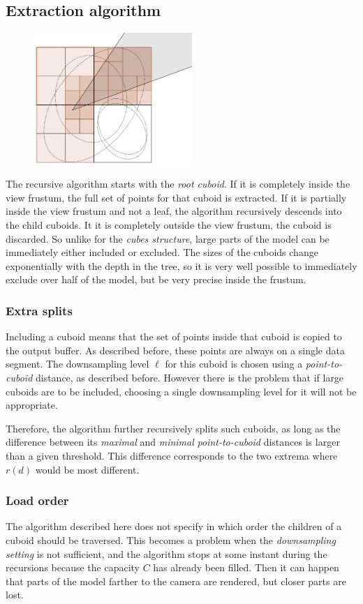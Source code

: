 \documentclass[a4paper,10pt,abstracton,notitlepage]{scrreprt}
\begin{document}
\subsection{Extraction algorithm}
\begin{figure}
\includegraphics[width=6cm]{octree.png}
\label{fig:octree}
\end{figure}
The recursive algorithm starts with the \emph{root cuboid}. If it is completely inside the view frustum, the full set of points for that cuboid is extracted. If it is partially inside the view frustum and not a leaf, the algorithm recursively descends into the child cuboids. It it is completely outside the view frustum, the cuboid is discarded. So unlike for the \emph{cubes structure}, large parts of the model can be immediately either included or excluded. The sizes of the cuboids change exponentially with the depth in the tree, so it is very well possible to immediately exclude over half of the model, but be very precise inside the frustum.

\subsubsection{Extra splits}
Including a cuboid means that the set of points inside that cuboid is copied to the output buffer. As described before, these points are always on a single data segment. The downsampling level $\ell$ for this cuboid is chosen using a \emph{point-to-cuboid} distance, as described before. However there is the problem that if large cuboids are to be included, choosing a single downsampling level for it will not be appropriate.

Therefore, the algorithm further recursively splits such cuboids, as long as the difference between its \emph{maximal} and \emph{minimal} \emph{point-to-cuboid} distances is larger than a given threshold. This difference corresponds to the two extrema where $r(d)$ would be most different.

\subsubsection{Load order}
The algorithm described here does not specify in which order the children of a cuboid should be traversed. This becomes a problem when the \emph{downsampling setting} is not sufficient, and the algorithm stops at some instant during the recursions because the capacity $C$ has already been filled. Then it can happen that parts of the model farther to the camera are rendered, but closer parts are lost.
\end{document}
